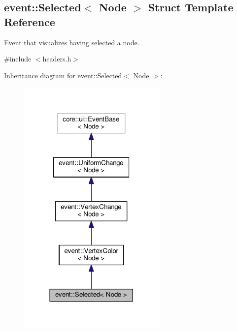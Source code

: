 \hypertarget{structevent_1_1Selected}{}\subsection{event\+:\+:Selected$<$ Node $>$ Struct Template Reference}
\label{structevent_1_1Selected}


Event that visualizes having selected a node.  




{\ttfamily \#include $<$headers.\+h$>$}



Inheritance diagram for event\+:\+:Selected$<$ Node $>$\+:\nopagebreak
\begin{figure}[H]
\begin{center}
\leavevmode
\includegraphics[width=206pt]{structevent_1_1Selected__inherit__graph}
\end{center}
\end{figure}


